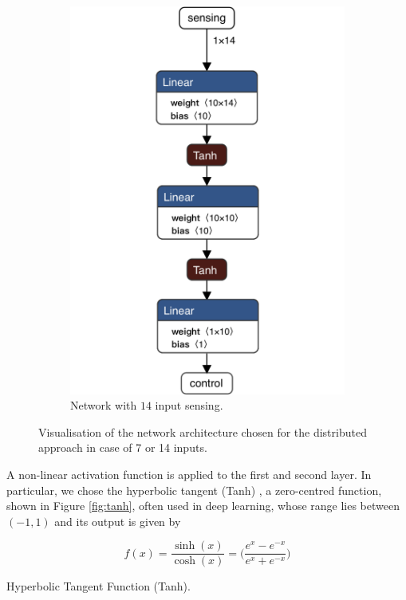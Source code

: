 \begin{figure}[htb]
\begin{subfigure}[h]{0.495\textwidth}
		\includegraphics[width=.8\textwidth]{contents/images/task1distributed_all@4x}
		\caption{Network with $14$ input sensing.}
		\label{fig:singlenet-d14distributed1}
	\end{subfigure}
	\caption[Network architectures for the distributed approach.]{Visualisation of 
	the network architecture chosen for the distributed approach in case of 7 or 14 
	inputs.}
	\label{fig:singlenetdistributed1}
\end{figure}

A non-linear activation function is applied to the first and second layer. 
In particular, we chose the hyperbolic tangent (Tanh) 
\cite[see][]{kalman1992tanh}, a zero-centred function, shown in Figure 
\ref{fig:tanh}, often used in deep learning, whose range lies between $(-1, 1)$ 
and its output is given by

\begin{Equation}[H]
	\centering
	\begin{equation}
	f(x)= \frac{\sinh (x)}{\cosh (x)} = \bigg( \frac{e^x - e^{-x}}{e^x + 
		e^{-x}}\bigg)
	\end{equation}
	\caption{Hyperbolic Tangent Function (Tanh).}
	\label{eq:tanh}
\end{Equation}

